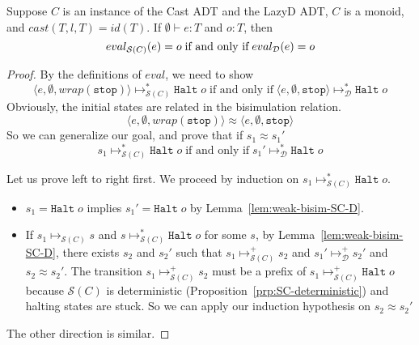 \documentclass[acmsmall,review]{acmart}\settopmatter{printfolios=true,printccs=false,printacmref=false}
\newcommand{\judgetype}[3]{#1 \vdash #2 : #3}
\newcommand{\lazyD}{Lazy\;D}
\newcommand{\sOOinspect}[3]{\langle#1,#2,#3\rangle}
\newcommand{\sOOhalt}[1]{\mathtt{Halt} \; #1}
\newcommand{\kOOmt}[0]{\mathtt{stop}}
\newcommand{\judgeSreduce}[3]{#2 \longmapsto_{\mathcal{S}(#1)} #3}
\newcommand{\judgeSreduceTrans}[3]{#2 \longmapsto_{\mathcal{S}(#1)}^{*} #3}
\newcommand{\judgeSreducePlus}[3]{#2 \longmapsto_{\mathcal{S}(#1)}^{+} #3}
\newcommand{\judgeSeval}[3]{eval_{\mathcal{S}(#1)}(#2) = #3}
\newcommand{\ineffCEKD}{\ensuremath{\mathcal{D}}}
\newcommand{\judgeDreduceTrans}[2]{#1 \longmapsto_{\mathcal{D}}^{*} #2}
\newcommand{\judgeDreducePlus}[2]{#1 \longmapsto_{\mathcal{D}}^{+} #2}
\newcommand{\judgeDeval}[2]{eval_{\mathcal{D}}(#1) = #2}
\newcommand{\effCEK}[1]{\ensuremath{\mathcal{S}(#1)}}
\newcommand{\evalEqv}[2]{
	\ensuremath{
		eval_{\text{#1}}(e) = o
		\;\text{if and only if}\;
		eval_{\text{#2}}(e) = o}
}
\begin{document}
\begin{corollary}[Correctness of \effCEK{C}]
  \label{thm:SD-equiv}
  Suppose $C$ is an instance of the Cast ADT
  and the \lazyD{} ADT, $C$ is a monoid,
  and $cast(T,l,T)=id(T)$.
  If $\judgetype{\emptyset}{e}{T}$ and $o : T$, then
  \[
    \text{\evalEqv{\effCEK{C}}{\ineffCEKD}}
  \]
\end{corollary}
\begin{proof}
	By the definitions of $eval$, we need to show 
	\[
	\judgeSreduceTrans{C}{\sOOinspect{e}{\emptyset}{wrap(\kOOmt)}}{
		\sOOhalt{o}
	}
	\;\text{if and only if}\;
	\judgeDreduceTrans{\sOOinspect{e}{\emptyset}{\kOOmt}}{
		\sOOhalt{o}
	}
	\]
	Obviously, the initial states are related in the bisimulation relation.
	\[
	\sOOinspect{e}{\emptyset}{wrap(\kOOmt)}
	\approx
	\sOOinspect{e}{\emptyset}{\kOOmt}
	\]
	So we can generalize our goal, and prove that if $s_1 \approx s_1'$
	\[
	\judgeSreduceTrans{C}{s_1}{\sOOhalt{o}}
	\;\text{if and only if}\;
	\judgeDreduceTrans{s_1'}{\sOOhalt{o}}
	\]
	
	Let us prove left to right first. We proceed by induction on 
	$\judgeSreduceTrans{C}{s_1}{\sOOhalt{o}}$.
	
	\begin{itemize}
		\item 
		$s_1 = \sOOhalt{o}$ implies $s_1' = \sOOhalt{o}$ by 
		Lemma~\ref{lem:weak-bisim-SC-D}.
		\item 
		If $\judgeSreduce{C}{s_1}{s}$ and 
		$\judgeSreduceTrans{C}{s}{\sOOhalt{o}}$ for some $s$,
		by Lemma~\ref{lem:weak-bisim-SC-D}, there exists $s_2$ and $s_2'$ such 
		that $\judgeSreducePlus{C}{s_1}{s_2}$ and 
		$\judgeDreducePlus{s_1'}{s_2'}$ 
		and $s_2 \approx s_2'$. The transition $\judgeSreducePlus{C}{s_1}{s_2}$ 
		must be a prefix of $\judgeSreducePlus{C}{s_1}{\sOOhalt{o}}$ because 
		\effCEK{C} is deterministic (Proposition~\ref{prp:SC-deterministic}) 
		and halting states are stuck. 
		So we can apply our induction hypothesis on $s_2 \approx s_2'$
	\end{itemize}
	The other direction is similar.
\end{proof}

\end{document}
